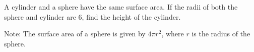 A cylinder and a sphere have the same surface area. If the radii of both the sphere and cylinder are $6$, find the height of the cylinder.



Note: The surface area of a sphere is given by $4\pi r^2$, where $r$ is the radius of the sphere.
